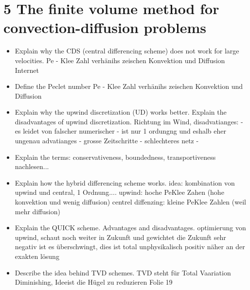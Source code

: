 \documentclass[a4paper]{scrartcl}
\begin{document}
\section{5 The finite volume method for convection-diffusion problems}
\begin{itemize}
\item Explain why the CDS (central differencing scheme) does not work for large velocities.
Pe - Klee Zahl verhänihs zeischen Konvektion und Diffusion
Internet

\item Define the Peclet number
Pe - Klee Zahl verhänihs zeischen Konvektion und Diffusion

\item Explain why the upwind discretization (UD) works better. Explain the disadvantages of upwind discretization.
Richtung im Wind, 
disadvatianges:
- es leidet von falscher numerischer
- ist nur 1 ordungng und eshalb eher ungenau
advatianges
- grosse Zeitschritte
- schlechteres netz
- 



\item Explain the terms: conservativeness, boundedness, transportiveness
nachlesen...



\item Explain how the hybrid differencing scheme works.
idea: kombination von upwind und central, 1 Ordnung....
upwind: hoche PeKlee Zahen (hohe konvektion und wenig diffusion)
centrel diffenzing: kleine PeKlee Zahlen (weil mehr diffusion)

\item Explain the QUICK scheme. Advantages and disadvantages.
optimierung von upwind, schaut noch weiter in Zukunft und gewichtet die Zukunft
sehr negativ ist es überschwingt, dies ist total unphysikalisch
positiv näher an der exakten lösung




\item Describe the idea behind TVD schemes.
TVD steht für Total Vaariation Diminishing,
Ideeist die Hügel zu reduzieren
Folie 19



\end{itemize}
\end{document}
